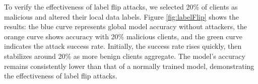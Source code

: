 \documentclass[conference]{IEEEtran}
\begin{document}



To verify the effectiveness of label flip attacks, we selected 20\% of clients as malicious and altered their local data labels. Figure \hyperref[fig:labelFlip]{\ref{fig:labelFlip}} shows the results: the blue curve represents global model accuracy without attackers, the orange curve shows accuracy with 20\% malicious clients, and the green curve indicates the attack success rate. Initially, the success rate rises quickly, then stabilizes around 20\% as more benign clients aggregate. The model's accuracy remains consistently lower than that of a normally trained model, demonstrating the effectiveness of label flip attacks.
\end{document}

